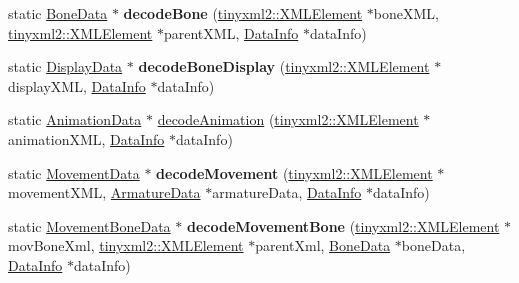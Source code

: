 \begin{DoxyCompactItemize}
\item 
\mbox{\label{classcocostudio_1_1DataReaderHelper_adf14f04ba762ec4bc330d2dd36307a71}} 
static \hyperlink{classcocostudio_1_1BoneData}{Bone\+Data} $\ast$ {\bfseries decode\+Bone} (\hyperlink{classtinyxml2_1_1XMLElement}{tinyxml2\+::\+X\+M\+L\+Element} $\ast$bone\+X\+ML, \hyperlink{classtinyxml2_1_1XMLElement}{tinyxml2\+::\+X\+M\+L\+Element} $\ast$parent\+X\+ML, \hyperlink{structcocostudio_1_1DataReaderHelper_1_1__DataInfo}{Data\+Info} $\ast$data\+Info)
\item 
\mbox{\label{classcocostudio_1_1DataReaderHelper_a6694805ca43bd2c86e6d0b3ab4f90135}} 
static \hyperlink{classcocostudio_1_1DisplayData}{Display\+Data} $\ast$ {\bfseries decode\+Bone\+Display} (\hyperlink{classtinyxml2_1_1XMLElement}{tinyxml2\+::\+X\+M\+L\+Element} $\ast$display\+X\+ML, \hyperlink{structcocostudio_1_1DataReaderHelper_1_1__DataInfo}{Data\+Info} $\ast$data\+Info)
\item 
static \hyperlink{classcocostudio_1_1AnimationData}{Animation\+Data} $\ast$ \hyperlink{classcocostudio_1_1DataReaderHelper_ae29c3ee9c35b7ecff9b3898b657db568}{decode\+Animation} (\hyperlink{classtinyxml2_1_1XMLElement}{tinyxml2\+::\+X\+M\+L\+Element} $\ast$animation\+X\+ML, \hyperlink{structcocostudio_1_1DataReaderHelper_1_1__DataInfo}{Data\+Info} $\ast$data\+Info)
\item 
\mbox{\label{classcocostudio_1_1DataReaderHelper_a026456df0099db4b388974d9d17ed766}} 
static \hyperlink{classcocostudio_1_1MovementData}{Movement\+Data} $\ast$ {\bfseries decode\+Movement} (\hyperlink{classtinyxml2_1_1XMLElement}{tinyxml2\+::\+X\+M\+L\+Element} $\ast$movement\+X\+ML, \hyperlink{classcocostudio_1_1ArmatureData}{Armature\+Data} $\ast$armature\+Data, \hyperlink{structcocostudio_1_1DataReaderHelper_1_1__DataInfo}{Data\+Info} $\ast$data\+Info)
\item 
\mbox{\label{classcocostudio_1_1DataReaderHelper_a4367feb698852328954a9788c3d9f8b9}} 
static \hyperlink{classcocostudio_1_1MovementBoneData}{Movement\+Bone\+Data} $\ast$ {\bfseries decode\+Movement\+Bone} (\hyperlink{classtinyxml2_1_1XMLElement}{tinyxml2\+::\+X\+M\+L\+Element} $\ast$mov\+Bone\+Xml, \hyperlink{classtinyxml2_1_1XMLElement}{tinyxml2\+::\+X\+M\+L\+Element} $\ast$parent\+Xml, \hyperlink{classcocostudio_1_1BoneData}{Bone\+Data} $\ast$bone\+Data, \hyperlink{structcocostudio_1_1DataReaderHelper_1_1__DataInfo}{Data\+Info} $\ast$data\+Info)

\end{DoxyCompactItemize}
